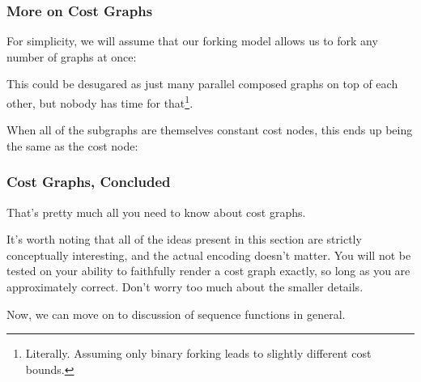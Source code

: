 \documentclass[aspectratio=169]{beamer}
\newcommand{\hex}[4][]{\node[hex, #1, minimum size=1cm] (#2) {$W$: #3 \\ $S$: #4}}
\begin{document}
\begin{frame}[fragile]
  \frametitle{More on Cost Graphs}

  For simplicity, we will assume that our forking model allows us to
  fork any number of graphs at once:

  \begin{center}
  \end{center}

  \pause
  \vspace{\fill}

  This could be desugared as just many parallel composed graphs on top of each
  other, but nobody has time for that\footnote{Literally. Assuming only binary forking
  leads to slightly different cost bounds.}.

  \pause
  \vspace{\fill}

  When all of the subgraphs are themselves constant cost nodes, this ends up being
  the same as the cost node:
  \begin{center}
  \end{center}
\end{frame}

\begin{frame}[fragile]
  \frametitle{Cost Graphs, Concluded}

  That's pretty much all you need to know about cost graphs.

  \pause
  \vspace{\fill}

  It's worth noting that all of the ideas present in this section
  are strictly conceptually interesting, and the actual encoding doesn't
  matter. You will not be tested on your ability to faithfully render a
  cost graph exactly, so long as you are approximately correct. Don't
  worry too much about the smaller details.

  \pause
  \vspace{\fill}

  Now, we can move on to discussion of sequence functions in general.
\end{frame}
\end{document}
